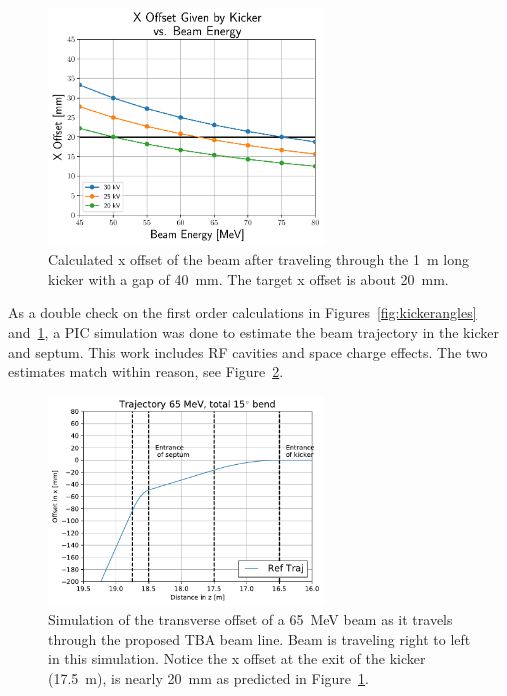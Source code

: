 \begin{figure}%
	\begin{center}
		\includegraphics[width=0.65\textwidth]{./images/XoffsetVsEnergy}
		\caption{Calculated x offset of the beam after traveling
		through the \SI{1}{m} long kicker with a gap of \SI{40}{mm}.
		The target x offset is about \SI{20}{mm}.}
		\label{fig:kickeroffset}
	\end{center}
\end{figure}
As a double check on the first order calculations in Figures~\ref{fig:kickerangles} and~\ref{fig:kickeroffset}, 
a PIC simulation was done to estimate the beam 
trajectory in the kicker and septum. 
This work includes RF cavities and space charge effects.
The two estimates match within reason, see Figure~\ref{fig:beamtraj}. 
\begin{figure}
	\begin{center}
		\includegraphics[width=0.65\textwidth]{./images/tba_trajectory}
		\caption{Simulation of the transverse offset of a \SI{65}{MeV} beam as 
			it travels through the proposed TBA beam line. 
			Beam is traveling right to left in this simulation. 
			Notice the x offset at the exit of the kicker (\SI{17.5}{m}), 
			is nearly \SI{20}{mm} as predicted in Figure~\ref{fig:kickeroffset}.}
		\label{fig:beamtraj}
	\end{center}
\end{figure}

